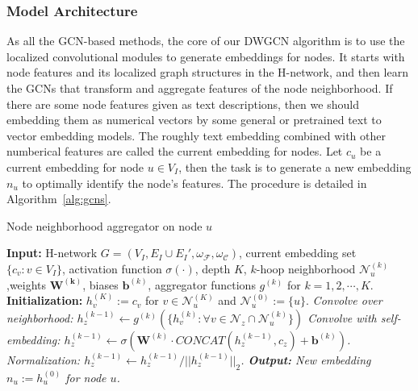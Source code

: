 \documentclass[manuscript,screen,review]{acmart}
\newcommand\Fcal{\mathcal{F}}
\newcommand{\Ncal}{\mathcal{N}}
\begin{document}

\subsubsection{Model Architecture}
As all the GCN-based methods, the core of our DWGCN algorithm is to use the localized convolutional modules to generate embeddings for nodes. It starts with node features and its localized graph structures in the H-network, and then learn the GCNs that transform and aggregate features of the node neighborhood. If there are some node features given as text descriptions, then we should embedding them as numerical vectors by some general or pretrained text to vector embedding models. The roughly text embedding combined with other numberical features are called the current embedding for nodes. Let $c_u$ be a current embedding for node $u\in V_I$, then the task is to generate a new embedding $n_u$ to optimally identify the node's features. The procedure is detailed in Algorithm~\ref{alg:gcns}.
\begin{algorithm}[h]
\caption{Node neighborhood aggregator on node $u$}
\label{alg:gcns}
\begin{algorithmic}[1]
\STATE \textbf{Input:} H-network $G=(V_I,E_I\cup E_I',\omega_{\mathcal{F}},\omega_{\mathcal{C}})$, current embedding set $\{c_v: v\in V_I\}$, activation function $\sigma(\cdot)$, depth $K$, $k$-hoop neighborhood $\Ncal_u^{(k)}$,weights $\mathbf{W^{(k)}}$, biases $\mathbf{b}^{(k)}$, aggregator functions $g^{(k)}$ for $k=1,2,\cdots,K$.
\STATE \textbf{Initialization:} $h_v^{(K)}:=c_v$ for $v\in \Ncal_u^{(K)}$ and $\Ncal_u^{(0)}:=\{u\}$.
\FOR{ $z\in \Ncal^{(k-1)}_u$}
\STATE \it{Convolve over neighborhood}: $h_z^{(k-1)}\leftarrow g^{(k)}\left(\{h^{(k)}_v: \forall{v}\in \Ncal_z\cap \Ncal^{(k)}_u\}\right)$
\STATE \it{Convolve with self-embedding:} $h_z^{(k-1)}\leftarrow \sigma\left(\mathbf{W}^{(k)}\cdot CONCAT(h_z^{(k-1)},c_z)+\mathbf{b}^{(k)}\right)$.
\STATE \it{Normalization: }
$h_z^{(k-1)}\leftarrow h_z^{(k-1)}/||h_z^{(k-1)}||_2$.
\ENDFOR
\ENDFOR
\STATE 
\textbf{Output:} New embedding $n_u:=h_u^{(0)}$ for node $u$.
\end{algorithmic}
\end{algorithm}
\vspace*{-2.5mm}
\end{document}
